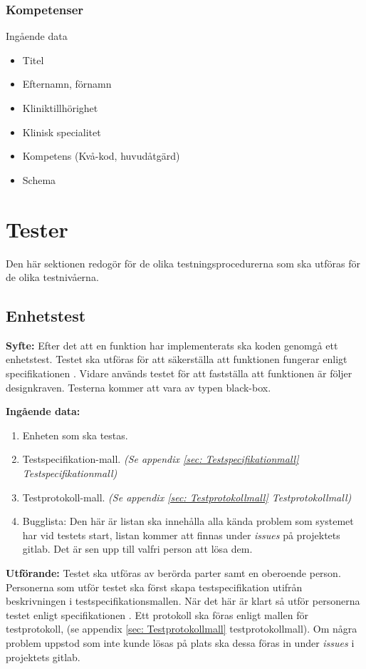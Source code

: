 \documentclass[a4paper,10pt, twoside]{article}
\begin{document}
\subsubsection{Kompetenser}
\label{sec: Kompetenser}
Ingående data
\begin{multicols}{2}
\begin{itemize}
	\item Titel
	\item Efternamn, förnamn
	\item Kliniktillhörighet
	\item Klinisk specialitet
	\item Kompetens (Kvå-kod, huvudåtgärd)
	\item Schema
\end{itemize}
\end{multicols}

\section{Tester}
Den här sektionen redogör för de olika testningsprocedurerna som ska utföras för de olika testnivåerna.

\subsection{Enhetstest}
\label{sec:Enhetstest}
\textbf{Syfte:} Efter det att en funktion har implementerats ska koden genomgå ett enhetstest. Testet ska utföras för att 
säkerställa att funktionen fungerar enligt specifikationen \cite{kravspec}. Vidare används testet för att fastställa att 
funktionen är följer designkraven. Testerna kommer att vara av typen black-box.

\textbf{Ingående data:}
\begin{enumerate}
    \item Enheten som ska testas.
    \item Testspecifikation-mall. \emph{(Se appendix \ref{sec: Testspecifikationmall} Testspecifikationmall)}
    \item Testprotokoll-mall. \emph{(Se appendix \ref{sec: Testprotokollmall} Testprotokollmall)}
    \item Bugglista: Den här är listan ska innehålla alla kända problem som systemet har vid testets start, listan kommer 
    att finnas under \emph{issues} på projektets gitlab. Det är sen upp till valfri person att lösa dem.
\end{enumerate}

\textbf{Utförande:} Testet ska utföras av berörda parter samt en oberoende person. Personerna som utför testet ska först 
skapa testspecifikation utifrån beskrivningen i testspecifikationsmallen. När det här är klart så utför personerna testet 
enligt specifikationen \cite{kravspec}. Ett protokoll ska föras enligt mallen för testprotokoll, (se appendix \ref{sec: 
Testprotokollmall} testprotokollmall). Om några problem uppstod som inte kunde lösas på plats ska dessa föras in under 
\emph{issues} i projektets gitlab.
\end{document}
